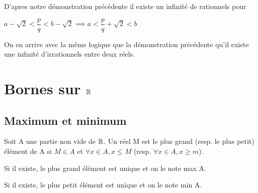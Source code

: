 \documentclass[a4paper, 12pt]{article}
\begin{document}
\begin{demonstration}
    D'apres notre démonstration précédente il existe un infinité de rationnels pour

    $a - \sqrt{2} \lt \dfrac{p}{q} \lt b - \sqrt{2} \implies a \lt \dfrac{p}{q} + \sqrt{2} \lt b$

    On en arrive avec la même logique que la démonstration précédente qu'il existe une infinité d'irrationnels entre deux réels.
\end{demonstration}
        
\section{Bornes sur $\mathbb{R}$}

\subsection{Maximum et minimum}

\begin{definition}
    Soit A une partie non vide de $\mathbb{R}$. Un réel M est le plus grand (resp. le plus petit) élément de A si $M \in A$ et
    $\forall x \in A, x \leq M$ (resp. $\forall x \in A, x \geq m$).

    Si il existe, le plus grand élément est unique et on le note max A.

    Si il existe, le plus petit élément est unique et on le note min A.
\end{definition}
\end{document}
